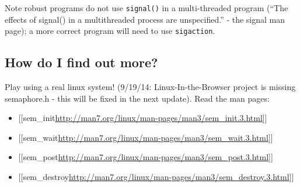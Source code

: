 \begin{Shaded}
\begin{Highlighting}[]


  
\NormalTok{\{}
\NormalTok{\}}

  
\NormalTok{\{}
    \NormalTok{);}
\NormalTok{\}}

 
\NormalTok{\{}
     \NormalTok{, } \NormalTok{); }
     \NormalTok{) \{}
       \NormalTok{);}
        \NormalTok{;}
    \NormalTok{\}}

\NormalTok{\}}
\end{Highlighting}
\end{Shaded}

Note robust programs do not use \texttt{signal()} in a multi-threaded
program (``The effects of signal() in a multithreaded process are
unspecified.'' - the signal man page); a more correct program will need
to use \texttt{sigaction}.

\subsection{How do I find out more?}\label{how-do-i-find-out-more}

Play using a real linux system! (9/19/14: Linux-In-the-Browser project
is missing semaphore.h - this will be fixed in the next update). Read
the man pages:

\begin{itemize}
\itemsep1pt\parskip0pt
\item
  {[}{[}sem\_init\textbar{}\url{http://man7.org/linux/man-pages/man3/sem_init.3.html}{]}{]}
\item
  {[}{[}sem\_wait\textbar{}\url{http://man7.org/linux/man-pages/man3/sem_wait.3.html}{]}{]}
\item
  {[}{[}sem\_post\textbar{}\url{http://man7.org/linux/man-pages/man3/sem_post.3.html}{]}{]}
\item
  {[}{[}sem\_destroy\textbar{}\url{http://man7.org/linux/man-pages/man3/sem_destroy.3.html}{]}{]}
\end{itemize}

